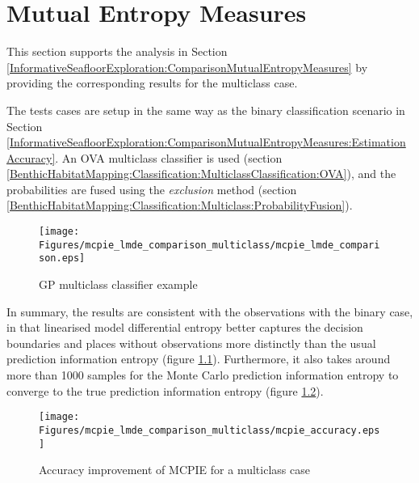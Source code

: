 \chapter{Mutual Entropy Measures}
\label{Appendix:MutualEntropyMeasures}

	This section supports the analysis in Section \ref{InformativeSeafloorExploration:ComparisonMutualEntropyMeasures} by providing the corresponding results for the multiclass case.
	
	The tests cases are setup in the same way as the binary classification scenario in Section \ref{InformativeSeafloorExploration:ComparisonMutualEntropyMeasures:EstimationAccuracy}. An OVA multiclass classifier is used (section \ref{BenthicHabitatMapping:Classification:MulticlassClassification:OVA}), and the probabilities are fused using the \textit{exclusion} method (section  \ref{BenthicHabitatMapping:Classification:Multiclass:ProbabilityFusion}).

	\begin{figure}[!htbp]
		\centering
			\texttt{[image: Figures/mcpie\_lmde\_comparison\_multiclass/mcpie\_lmde\_comparison.eps]}
		\caption{GP multiclass classifier example}
		\label{Figure:mcpie_lmde_comparison_multiclass}
	\end{figure}
		
	In summary, the results are consistent with the observations with the binary case, in that linearised model differential entropy better captures the decision boundaries and places without observations more distinctly than the usual prediction information entropy (figure \ref{Figure:mcpie_lmde_comparison_multiclass}). Furthermore, it also takes around more than 1000 samples for the Monte Carlo prediction information entropy to converge to the true prediction information entropy (figure \ref{Figure:mcpie_accuracy_multiclass}).
	
	\begin{figure}[!htbp]
		\centering
			\texttt{[image: Figures/mcpie\_lmde\_comparison\_multiclass/mcpie\_accuracy.eps]}
		\caption{Accuracy improvement of MCPIE for a multiclass case}
		\label{Figure:mcpie_accuracy_multiclass}
	\end{figure}